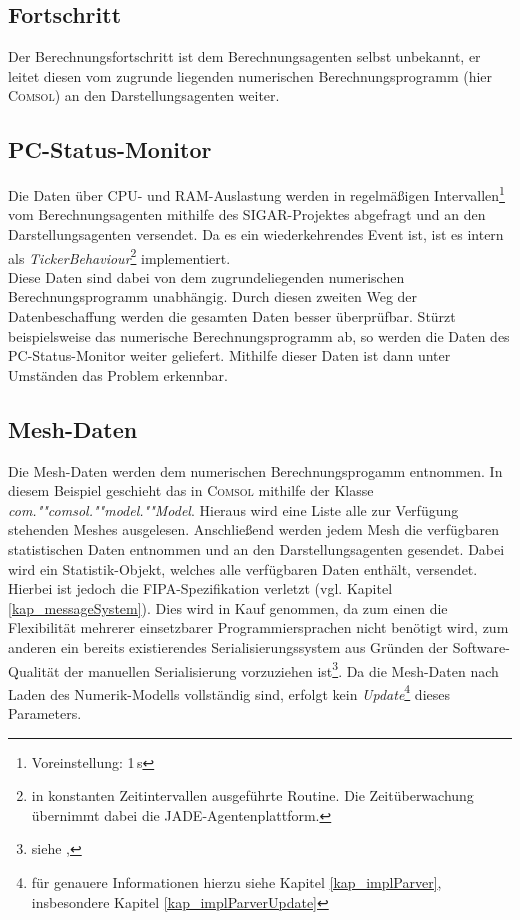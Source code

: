 \documentclass[a4paper,12pt,oneside,openright,onecolumn,final,titlepage,fleqn,ngerman]{scrreprt}
\newcommand{\parag}{\\[2ex]}
\newcommand{\calcag}{Berechnungsagent}
\newcommand{\repag}{Darstellungsagent}
\begin{document}
	\subsection{Fortschritt}
	Der Berechnungsfortschritt ist dem \calcag{}en selbst unbekannt, er leitet diesen vom zugrunde liegenden numerischen Berechnungsprogramm (hier \textsc{Comsol}) an den \repag{}en weiter.
	
	\subsection{PC-Status-Monitor}\label{kap_impl_data_pcs}
	Die Daten über CPU- und RAM-Auslastung werden in regelmäßigen Intervallen\footnote{Voreinstellung: 1\,s} vom \calcag{}en mithilfe des SIGAR-Projektes abgefragt und an den \repag{}en versendet. Da es ein wiederkehrendes Event ist, ist es intern als \emph{TickerBehaviour}\footnote{in konstanten Zeitintervallen ausgeführte Routine. Die Zeitüberwachung übernimmt dabei die JADE-Agentenplattform.} implementiert.\parag{}
	Diese Daten sind dabei von dem zugrundeliegenden numerischen Berechnungsprogramm unabhängig. Durch diesen zweiten Weg der Datenbeschaffung werden die gesamten Daten besser überprüfbar. Stürzt beispielsweise das numerische Berechnungsprogramm ab, so werden die Daten des PC-Status-Monitor weiter geliefert. Mithilfe dieser Daten ist dann unter Umständen das Problem erkennbar.

	\subsection{Mesh-Daten}\label{kap_implDataMesh}
	Die Mesh-Daten werden dem numerischen Berechnungsprogamm entnommen. In diesem Beispiel geschieht das in \textsc{Comsol} mithilfe der Klasse \emph{com.""comsol.""model.""Model}. Hieraus wird eine Liste alle zur Verfügung stehenden Meshes ausgelesen. Anschließend werden jedem Mesh die verfügbaren statistischen Daten entnommen und an den \repag{}en gesendet. Dabei wird ein Statistik-Objekt, welches alle verfügbaren Daten enthält, versendet. Hierbei ist jedoch die FIPA-Spezifikation verletzt (vgl. Kapitel \ref{kap_messageSystem}). Dies wird in Kauf genommen, da zum einen die Flexibilität mehrerer einsetzbarer Programmiersprachen nicht benötigt wird, zum anderen ein bereits existierendes Serialisierungssystem aus Gründen der Software-Qualität der manuellen Serialisierung vorzuziehen ist\footnote{siehe , }. Da die Mesh-Daten nach Laden des Numerik-Modells vollständig sind, erfolgt kein \emph{Update}\footnote{für genauere Informationen hierzu siehe Kapitel \ref{kap_implParver}, insbesondere Kapitel \ref{kap_implParverUpdate}} dieses Parameters.
	
\end{document}
